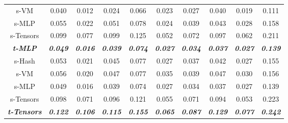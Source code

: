 \documentclass[letterpaper]{article} \usepackage{aaai23}  \usepackage{times}  \usepackage{helvet}  \usepackage{courier}  \usepackage[hyphens]{url}  \usepackage{graphicx} \urlstyle{rm} \def\UrlFont{\rm}  \usepackage{natbib}  \usepackage{caption} \frenchspacing  \setlength{\pdfpagewidth}{8.5in}  \setlength{\pdfpageheight}{11in}  \usepackage{multirow}
\begin{document}
\begin{table*}[t]
{\begin{tabular}{c|ccccccccc}
s-VM                        & 0.040                   & 0.012                   & 0.024                   & 0.066                   & 0.023                   & 0.027                   & 0.040                   & 0.019                   & 0.111                   \\
s-MLP                       & 0.055                   & 0.022                   & 0.051                   & 0.078                   & 0.024                   & 0.039                   & 0.043                   & 0.028                   & 0.158                   \\
s-Tensors                   & 0.099                   & 0.077                   & 0.099                   & 0.125                   & 0.052                   & 0.072                   & 0.097                   & 0.062                   & 0.211                   \\ \hline
\textit{\textbf{t-MLP}}     & \textit{\textbf{0.049}} & \textit{\textbf{0.016}} & \textit{\textbf{0.039}} & \textit{\textbf{0.074}} & \textit{\textbf{0.027}} & \textit{\textbf{0.034}} & \textit{\textbf{0.037}} & \textit{\textbf{0.027}} & \textit{\textbf{0.139}} \\ \hline
s-Hash                      & 0.053                   & 0.021                   & 0.045                   & 0.077                   & 0.027                   & 0.037                   & 0.042                   & 0.027                   & 0.155                   \\
s-VM                        & 0.056                   & 0.020                   & 0.047                   & 0.077                   & 0.035                   & 0.039                   & 0.047                   & 0.030                   & 0.156                   \\
s-MLP                       & 0.049                   & 0.016                   & 0.039                   & 0.074                   & 0.027                   & 0.034                   & 0.037                   & 0.027                   & 0.139                   \\
s-Tensors                   & 0.098                   & 0.071                   & 0.096                   & 0.121                   & 0.055                   & 0.071                   & 0.094                   & 0.053                   & 0.223                   \\ \hline
\textit{\textbf{t-Tensors}} & \textit{\textbf{0.122}} & \textit{\textbf{0.106}} & \textit{\textbf{0.115}} & \textit{\textbf{0.155}} & \textit{\textbf{0.065}} & \textit{\textbf{0.087}} & \textit{\textbf{0.129}} & \textit{\textbf{0.077}} & \textit{\textbf{0.242}} \\ \hline

\end{tabular}}
\end{table*}
\end{document}

